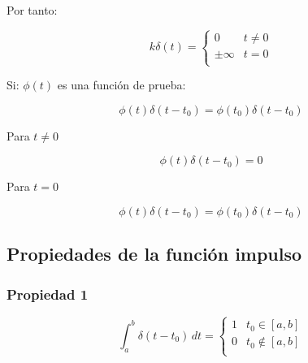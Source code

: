 Por tanto:

\begin{equation*}
    k\delta(t)=\begin{cases}
        0         & t\neq0\\
        \pm\infty & t=0\\
    \end{cases}
\end{equation*}

\begin{figure}[H]
    \centering
    
\end{figure}

\begin{figure}[H]
    \centering
    
\end{figure}

Si: $\phi(t)$ es una función de prueba:

\begin{equation*}
    \phi(t)\delta(t-t_0)=\phi(t_0)\delta(t-t_0)
\end{equation*}

\begin{figure}[H]
    \centering
    
\end{figure}

Para $t\neq0$

\begin{equation*}
    \phi(t)\delta(t-t_0)=0
\end{equation*}

Para $t=0$

\begin{equation*}
    \phi(t)\delta(t-t_0)=\phi(t_0)\delta(t-t_0)
\end{equation*}

\subsection{Propiedades de la función impulso}

\subsubsection*{Propiedad 1}

\begin{equation*}
    \int_a^b \delta(t-t_0)\,dt=\begin{cases}
        1 & t_0\in[a,b] \\
        0 & t_0\notin[a,b] \\
    \end{cases}
\end{equation*}

